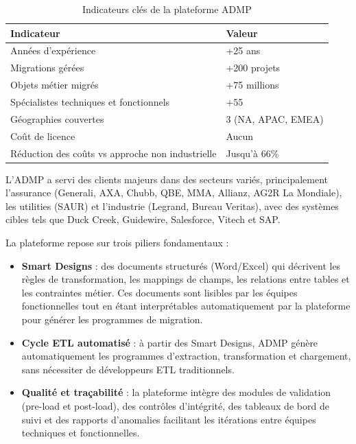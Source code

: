 \begin{table}[h!]
\centering
\caption{Indicateurs clés de la plateforme ADMP}
\label{tab:admp-kpi}
\begin{tabular}{ll}
\toprule
\textbf{Indicateur} & \textbf{Valeur} \\
\midrule
Années d'expérience & +25 ans \\
Migrations gérées & +200 projets \\
Objets métier migrés & +75 millions \\
Spécialistes techniques et fonctionnels & +55 \\
Géographies couvertes & 3 (NA, APAC, EMEA) \\
Coût de licence & Aucun \\
Réduction des coûts vs approche non industrielle & Jusqu'à 66\% \\
\bottomrule
\end{tabular}
\end{table}

L'ADMP a servi des clients majeurs dans des secteurs variés, principalement l'assurance (Generali, AXA, Chubb, QBE, MMA, Allianz, AG2R La Mondiale), les utilities (SAUR) et l'industrie (Legrand, Bureau Veritas), avec des systèmes cibles tels que Duck Creek, Guidewire, Salesforce, Vitech et SAP.

La plateforme repose sur trois piliers fondamentaux :

\begin{itemize}[leftmargin=*]
    \item \textbf{Smart Designs} : des documents structurés (Word/Excel) qui décrivent les règles de transformation, les mappings de champs, les relations entre tables et les contraintes métier. Ces documents sont lisibles par les équipes fonctionnelles tout en étant interprétables automatiquement par la plateforme pour générer les programmes de migration.
    
    \item \textbf{Cycle ETL automatisé} : à partir des Smart Designs, ADMP génère automatiquement les programmes d'extraction, transformation et chargement, sans nécessiter de développeurs ETL traditionnels.
    
    \item \textbf{Qualité et traçabilité} : la plateforme intègre des modules de validation (pre-load et post-load), des contrôles d'intégrité, des tableaux de bord de suivi et des rapports d'anomalies facilitant les itérations entre équipes techniques et fonctionnelles.
\end{itemize}

